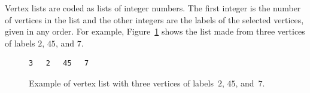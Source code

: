 Vertex lists are coded as lists of integer numbers.
The first integer is the number of vertices in the list and
the other integers are the labels of the selected vertices, given in
any order.
For example, Figure~\ref{fig-file-vertex} shows the list made from
three vertices of labels $2$, $45$, and $7$.
\begin{figure}[hbt]
\begin{center}
\begin{minipage}{3cm}
{\renewcommand{\baselinestretch}{1.05}
 \footnotesize \tt \begin{verbatim}
3   2   45   7
\end{verbatim}}
\end{minipage}
\end{center}
\caption{Example of vertex list with three vertices of labels~$2$, $45$, and~$7$.}
\label{fig-file-vertex}
\end{figure}
